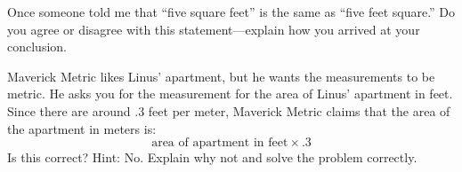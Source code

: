 \begin{prob}
Once someone told me that ``five square feet'' is the same as ``five
feet square.'' Do you agree or disagree with this statement---explain
how you arrived at your conclusion.
\end{prob}







\begin{prob}
Maverick Metric likes Linus' apartment, but he wants the measurements
to be metric. He asks you for the measurement for the area of Linus'
apartment in feet. Since there are around $.3$ feet per meter,
Maverick Metric claims that the area of the apartment in meters is:
\[
\text{area of apartment in feet} \times .3 
\]
Is this correct? Hint: No. Explain why not and solve the problem
correctly.
\end{prob}


